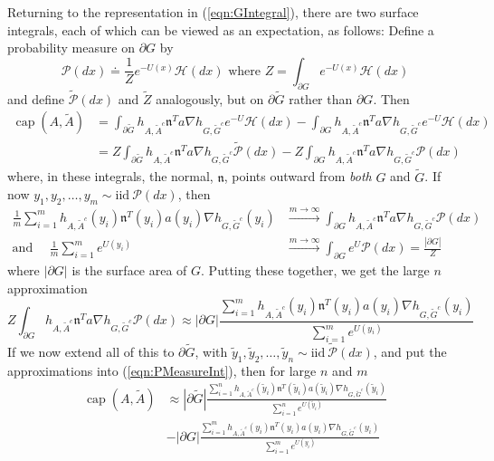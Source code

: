 \documentclass[12pt, nofootinbib,english, amsmath, amssymb, aps, priprint, graphicx,floatfix]{revtex4-1}
\theoremstyle{plain}
\theoremstyle{definition}
\theoremstyle{plain}
\newcommand{\normal}{{\mathfrak{n}}}
\newcommand{\capac}[2]{\ensuremath{\operatorname{cap}}(#1,#2)}
\newcommand{\hausdorffmeasure}{\mathscr{H}(dx)}
\newcommand{\PMeasure}{\mathscr{P}(dx)}
\newcommand{\tPMeasure}{\tilde{\mathscr P}(dx)}
\begin{document}
Returning to the representation in (\ref{eqn:GIntegral}), there are two surface integrals, each of which can be viewed as an expectation, as follows: Define a probability measure on
$\partial G$ by
\[
\PMeasure\doteq\frac{1}{Z}e^{-U(x)}\hausdorffmeasure 
\text{   where   }
Z= \int_{\partial G} e^{-U(x)}\hausdorffmeasure
\]
and define $\tPMeasure$
and $\tilde{Z}$ analogously, but on $\partial\tilde{G}$ rather than $\partial G$.
Then
\begin{align}
\capac{A}{\tilde A} & = \int_{\partial\tilde{G}} h_{A, \tilde{A}^c}    \normal^T a  \nabla h_{G, \tilde{G}^c} e^{- U } \hausdorffmeasure
-\int_{\partial G} h_{A, \tilde{A}^c}    \normal^T a  \nabla h_{G, \tilde{G}^c} e^{- U } \hausdorffmeasure
\nonumber \\
&=Z
\int_{\partial\tilde{G}} h_{A, \tilde{A}^c}    \normal^T a  \nabla h_{G, \tilde{G}^c} \tPMeasure
-Z
\int_{\partial G} h_{A, \tilde{A}^c}    \normal^T a  
\nabla h_{G,\tilde{G}^c} \PMeasure
\label{eqn:PMeasureInt}
\end{align}
where, in these integrals, the normal, $\normal$, points outward from {\em both} $G$ and $\tilde G$.
If now $y_1,y_2,\dots,y_m\sim \text{iid}\ \PMeasure$, then 
\begin{align*}
\frac{1}{m}\sum_{i=1}^m 
h_{A, \tilde{A}^c}(y_i) \normal^T(y_i) a(y_i)  \nabla h_{G,\tilde{G}^c}(y_i) & \stackrel{m\to\infty}{\longrightarrow}
 \int_{\partial G} h_{A, \tilde{A}^c}    \normal^T a  
\nabla h_{G,\tilde{G}^c} \PMeasure \\
\text{and}\ \ \ \ \ \ \frac{1}{m}\sum_{i=1}^m e^{U(y_i)}
& \stackrel{m\to\infty}{\longrightarrow} \int_{\partial G} e^U
\PMeasure = \frac{|\partial G|}{Z}
\end{align*}
where $|\partial G|$ is the surface area of $G$. Putting these together, we get the large $n$ approximation
\[
Z
\int_{\partial G} h_{A, \tilde{A}^c}    \normal^T a  
\nabla h_{G,\tilde{G}^c} \PMeasure
\approx
|\partial G|
\frac{\sum_{i=1}^m 
h_{A, \tilde{A}^c}(y_i) \normal^T(y_i) a(y_i)  \nabla h_{G,\tilde{G}^c}(y_i)}
{\sum_{i=1}^m e^{U(y_i)}}
\]
If we now extend all of this to $\partial\tilde{G}$, with 
$\tilde{y}_1,\tilde{y}_2,\dots,\tilde{y}_n\sim \text{iid}\ \tPMeasure$, and put the approximations into 
(\ref{eqn:PMeasureInt}), then for large $n$ and $m$
\begin{align}
\capac{A}{\tilde A} & \approx
|\partial\tilde{G}|
\frac{\sum_{i=1}^n 
h_{A, \tilde{A}^c}(\tilde{y}_i) \normal^T(\tilde{y}_i) a(\tilde{y}_i)  \nabla h_{G,\tilde{G}^c}(\tilde{y}_i)}
{\sum_{i=1}^n e^{U(\tilde{y}_i)}}
\label{eqn:approximate_capacity}\\
& -|\partial G|
\frac{\sum_{i=1}^m 
h_{A, \tilde{A}^c}(y_i) \normal^T(y_i) a(y_i)  \nabla h_{G,\tilde{G}^c}(y_i)}
{\sum_{i=1}^m e^{U(y_i)}}
\nonumber
\end{align}
\end{document}
